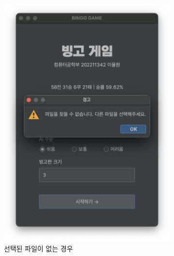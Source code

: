 \begin{figure}[H]
    \begin{subfigure}{.5\textwidth}
        \centering
        \includegraphics[scale=0.4]{img/main-file-not-found.png}
        \caption{선택된 파일이 없는 경우}
    \end{subfigure}
    \begin{subfigure}{.5\textwidth}
        \centering

\end{subfigure}
\end{figure}
